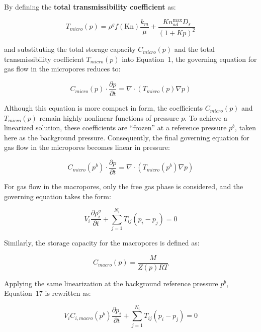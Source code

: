 \documentclass{article}
\begin{document}
By defining the \textbf{total transmissibility coefficient} as:

\begin{equation}
    T_{micro}(p)=\rho^{g} f(\mathrm{Kn}) \frac{k_{m}}{\mu}+\frac{K n_{ad}^{\max} D_{s}}{(1+K p)^{2}}
\end{equation}

and substituting the total storage capacity $C_{micro}(p)$ and the total transmissibility coefficient $T_{micro}(p)$ into Equation~1, the governing equation for gas flow in the micropores reduces to:

\begin{equation}
    C_{micro}(p) \cdot \frac{\partial p}{\partial t}=\nabla \cdot\left(T_{micro}(p) \nabla p\right)
\end{equation}

Although this equation is more compact in form, the coefficients $C_{micro}(p)$ and $T_{micro}(p)$ remain highly nonlinear functions of pressure $p$. To achieve a linearized solution, these coefficients are ``frozen'' at a reference pressure $p^{b}$, taken here as the background pressure. Consequently, the final governing equation for gas flow in the micropores becomes linear in pressure:

\begin{equation}
    C_{micro}(p^{b}) \cdot \frac{\partial p}{\partial t}=\nabla \cdot\left(T_{micro}(p^{b}) \nabla p\right)
\end{equation}

For gas flow in the macropores, only the free gas phase is considered, and the governing equation takes the form:

\begin{equation}
    V_{i} \frac{\partial \rho_{i}^{g}}{\partial t}+\sum_{j=1}^{N_{i}} T_{ij}\left(p_{i}-p_{j}\right)=0
\end{equation}

Similarly, the storage capacity for the macropores is defined as:

\begin{equation}
    C_{macro}(p)=\frac{M}{Z(p) R T}
\end{equation}

Applying the same linearization at the background reference pressure $p^{b}$, Equation~17 is rewritten as:

\begin{equation}
    V_{i} C_{i,macro}(p^{b}) \frac{\partial p_{i}}{\partial t}+\sum_{j=1}^{N_{i}} T_{ij}\left(p_{i}-p_{j}\right)=0
\end{equation}
\end{document}
